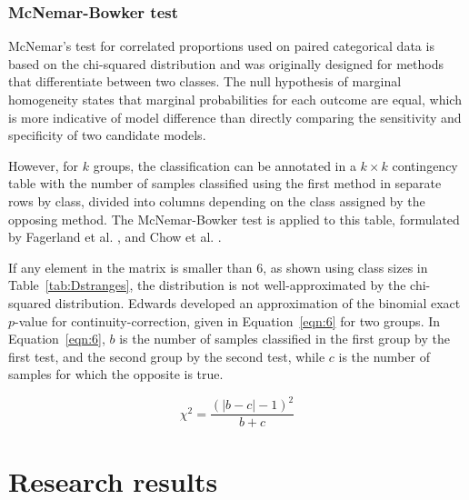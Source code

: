 \let\LaTeXcline\cline\documentclass[sn-mathphys-num]{sn-jnl}\let\cline\LaTeXcline
\begin{document}
\subsubsection{McNemar-Bowker test}

McNemar’s test for correlated proportions used on paired categorical data is based on the chi-squared distribution and was originally designed for methods that differentiate between two classes. The null hypothesis of marginal homogeneity states that marginal probabilities for each outcome are equal, which is more indicative of model difference than directly comparing the sensitivity and specificity of two candidate models.

However, for $k$ groups, the classification can be annotated
in a $k \times k$ contingency table with the number of samples classified using the first method in separate rows by class, divided into columns depending on the class assigned by the opposing method. The McNemar-Bowker test is applied to this table, formulated by Fagerland et al. \cite{fagerland2017statistical}, and Chow et al. \cite{chow2018sample}.

If any element in the matrix is smaller than $6$, as shown using class sizes in Table~\ref{tab:Dstranges}, the distribution is not well-approximated by the chi-squared distribution. Edwards \cite{edwards1948note} developed an approximation of the binomial exact $p$-value for continuity-correction, given in Equation~\ref{eqn:6} for two groups. In Equation~\ref{eqn:6}, $b$ is the number of samples classified in the first group by the first test, and the second group by the second test, while $c$ is the number of samples for which the opposite is true.
 
\begin{equation}
    \chi^{2}=\frac{(|b-c|-1)^{2}}{b+c}
    \label{eqn:6}
\end{equation}

\section{Research results}
\label{sec:Results}
\end{document}
